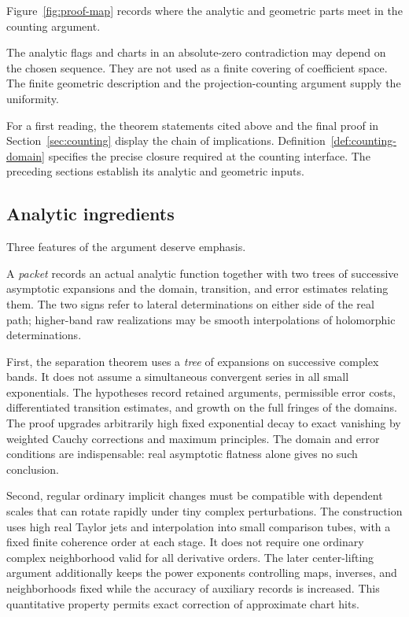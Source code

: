 Figure~\ref{fig:proof-map} records where the analytic and geometric
parts meet in the counting argument.


The analytic flags and charts in an absolute-zero contradiction may
depend on the chosen sequence. They are not used as a finite covering
of coefficient space. The finite geometric description and the
projection-counting argument supply the uniformity.

For a first reading, the theorem statements cited above and the final
proof in Section~\ref{sec:counting} display the chain of implications.
Definition~\ref{def:counting-domain} specifies the precise closure
required at the counting interface. The preceding sections establish
its analytic and geometric inputs.

\subsection{Analytic ingredients}

Three features of the argument deserve emphasis.

A \emph{packet} records an actual analytic function together with two
trees of successive asymptotic expansions and the domain, transition,
and error estimates relating them. The two signs refer to lateral
determinations on either side of the real path; higher-band raw
realizations may be smooth interpolations of holomorphic determinations.

First, the separation theorem uses a \emph{tree} of expansions on
successive complex bands. It does not assume a simultaneous convergent
series in all small exponentials. The hypotheses record retained
arguments, permissible error costs, differentiated transition
estimates, and growth on the full fringes of the domains.
The proof upgrades arbitrarily high fixed exponential decay to exact
vanishing by weighted Cauchy corrections and maximum principles.
The domain and error conditions are indispensable: real asymptotic
flatness alone gives no such conclusion.

Second, regular ordinary implicit changes must be compatible with
dependent scales that can rotate rapidly under tiny complex
perturbations. The construction uses high real Taylor jets and
interpolation into small comparison tubes, with a fixed finite
coherence order at each stage. It does not require one ordinary
complex neighborhood valid for all derivative orders.
The later center-lifting argument additionally keeps the power
exponents controlling maps, inverses, and neighborhoods fixed while
the accuracy of auxiliary records is increased. This quantitative
property permits exact correction of approximate chart hits.

